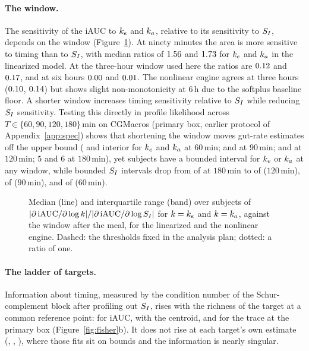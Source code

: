 \paragraph{The window.}
The sensitivity of the iAUC to $k_e$ and $k_a$, relative to its sensitivity to $S_I$, depends on the window
(Figure~\ref{fig:window}). At ninety minutes the area is more sensitive to timing than to $S_I$, with median ratios of
$1.56$ and $1.73$ for $k_e$ and $k_a$ in the linearized model. At the three-hour window
used here the ratios are $0.12$ and $0.17$, and at six hours
$0.00$ and $0.01$. The nonlinear engine agrees at three
hours ($0.10$, $0.14$) but shows slight non-monotonicity at $6$\,h due to the softplus baseline floor. A shorter window increases timing sensitivity relative to $S_I$ while reducing $S_I$ sensitivity. Testing this directly in profile likelihood across $T\in\{60, 90, 120, 180\}$\,min on CGMacros (primary box, earlier protocol of Appendix~\ref{app:spec}) shows that shortening the window moves gut-rate estimates off the upper bound (\resWinProfSixtyKeInt{} and \resWinProfSixtyKaInt{} interior for $k_e$ and $k_a$ at $60$\,min; \resWinProfNinetyKeInt{} and \resWinProfNinetyKaInt{} at $90$\,min; \resWinProfOneTwentyKeInt{} and \resWinProfOneTwentyKaInt{} at $120$\,min; $5$ and $6$ at $180$\,min), yet \resWinProfSixtyKeBd{} subjects have a bounded interval for $k_e$ or $k_a$ at any window, while bounded $S_I$ intervals drop from \resProfileIaucSIInteriorBoundedOne{} of \resProfileIaucSIInteriorNOne{} at $180$\,min to \resWinProfOneTwentySIBd{} of \resWinProfOneTwentySIInt{} ($120$\,min), \resWinProfNinetySIBd{} of \resWinProfNinetySIInt{} ($90$\,min), and \resWinProfSixtySIBd{} of \resWinProfSixtySIInt{} ($60$\,min).

\begin{figure}[tbp]
\centering
{}
\caption{Median (line) and interquartile range (band) over subjects of
$|\partial\,\mathrm{iAUC}/\partial\log k|/|\partial\,\mathrm{iAUC}/\partial\log S_I|$ for $k=k_e$ and $k=k_a$, against the
window after the meal, for the linearized and the nonlinear engine. Dashed: the thresholds fixed in the analysis plan; dotted:
a ratio of one.}
\label{fig:window}
\end{figure}

\paragraph{The ladder of targets.}
Information about timing, measured by the condition number of the Schur-complement block after profiling out $S_I$,
rises with the richness of the target at a common reference point: \resCondRefIaucOne{} for iAUC,
\resCondRefCentroidOne{} with the centroid, and \resCondRefTraceOne{} for the trace at the primary box
(Figure~\ref{fig:fisher}b). It does not rise at each target's own estimate (\resCondOwnIaucOne{},
\resCondOwnCentroidOne{}, \resCondOwnTraceOne{}), where those fits sit on bounds and the information is nearly singular.

